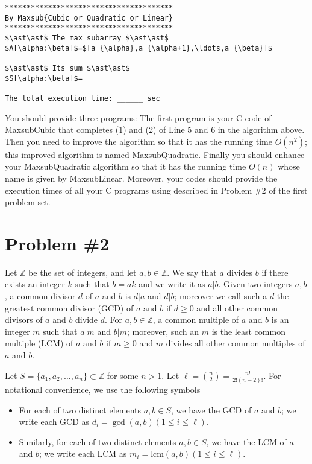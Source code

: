 \documentclass{article}
\newcommand{\Z}{\mathbb{Z}}
\newcommand{\lcm}{{\mathrm{lcm}}}
\begin{document}
\begin{lstlisting}[backgroundcolor=\color{yellow!40}]
***************************************
By Maxsub{Cubic or Quadratic or Linear}
***************************************
$\ast\ast$ The max subarray $\ast\ast$
$A[\alpha:\beta]$=$[a_{\alpha},a_{\alpha+1},\ldots,a_{\beta}]$

$\ast\ast$ Its sum $\ast\ast$
$S[\alpha:\beta]$=

The total execution time: ______ sec
\end{lstlisting}

You should provide three programs: The first program is your  C code of \textsf{MaxsubCubic}
that completes (1) and (2) of Line 5 and 6 in the algorithm above. Then you need to improve the algorithm 
so that it has the running time $O(n^2)$; this improved algorithm is named \textsf{MaxsubQuadratic}.
Finally you should enhance your \textsf{MaxsubQuadratic} algorithm so that it has the running time $O(n)$ whose name 
is given by \textsf{MaxsubLinear}.
Moreover, your codes should provide the execution times of all your C programs using described in Problem \#2 of the first problem set.


\newpage
\section{Problem \#2}
Let $\Z$ be the set of integers, and let $a,b\in\Z$.
We say that $a$ divides $b$ if there exists an integer $k$ such that $b=ak$ and 
we write it as $a|b$.
Given two integers $a,b$, a common divisor $d$ of $a$ and $b$ is $d|a$ and $d|b$;
moreover we call such a $d$ the greatest common divisor (GCD) of $a$ and $b$ if
$d\geq 0$ and all other common divisors of $a$ and $b$ divide $d$.
For $a,b\in\Z$, a common multiple of $a$ and $b$ is an integer $m$ such that $a|m$ and $b|m$;
moreover, such an $m$ is the least common multiple (LCM) of $a$ and $b$ if
$m\geq 0$ and $m$ divides all other common multiples of $a$ and $b$.


Let $S=\{a_1,a_2,\ldots,a_n\}\subset\Z$ for some $n>1$. Let $\ell={n\choose 2}=\frac{n!}{2!(n-2)!}$.
For notational convenience, we use the following symbols
\begin{itemize}
\item For each of  two distinct elements $a,b\in S$, we have the GCD of $a$ and $b$; we write each GCD as $d_i=\gcd(a,b)(1\leq i\leq \ell)$. 
\item Similarly, for each of  two distinct elements $a,b\in S$, we have the LCM of $a$ and $b$; we write each LCM as $m_i=\lcm(a,b)(1\leq i\leq \ell)$.
\end{itemize}
\end{document}
